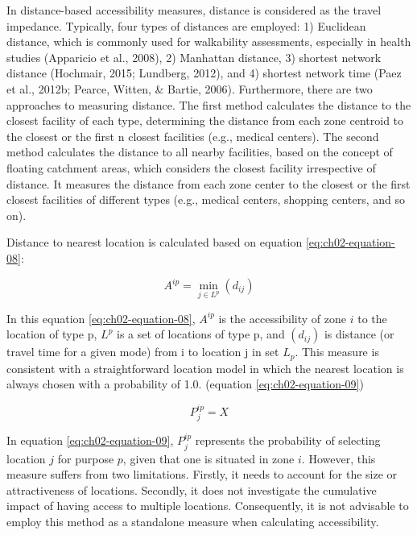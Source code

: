 \documentclass[
11pt, %
oneside, %
english, %
singlespacing, %
]{macthesis} %
\begin{document}
In distance-based accessibility measures, distance is considered as the travel impedance. Typically, four types of distances are employed: 1) Euclidean distance, which is commonly used for walkability assessments, especially in health studies (Apparicio et al., 2008), 2) Manhattan distance, 3) shortest network distance (Hochmair, 2015; Lundberg, 2012), and 4) shortest network time (Paez et al., 2012b; Pearce, Witten, \& Bartie, 2006). Furthermore, there are two approaches to measuring distance. The first method calculates the distance to the closest facility of each type, determining the distance from each zone centroid to the closest or the first n closest facilities (e.g., medical centers). The second method calculates the distance to all nearby facilities, based on the concept of floating catchment areas, which considers the closest facility irrespective of distance. It measures the distance from each zone center to the closest or the first closest facilities of different types (e.g., medical centers, shopping centers, and so on).

Distance to nearest location is calculated based on equation \ref{eq:ch02-equation-08}:

\begin{equation}
A^{ip} = \min_{j \in L^p} (d_{ij})
\label{eq:ch02-equation-08}
\end{equation}

In this equation \ref{eq:ch02-equation-08}, \(A^{ip}\) is the accessibility of zone \(i\) to the location of type p, \(L^p\) is a set of locations of type p, and \((d_{ij})\) is distance (or travel time for a given mode) from i to location j in set \(L_p\). This measure is consistent with a straightforward location model in which the nearest location is always chosen with a probability of 1.0. (equation \ref{eq:ch02-equation-09})

\begin{equation}
P^{ip}_j = X
\label{eq:ch02-equation-09}
\end{equation}

In equation \ref{eq:ch02-equation-09}, \(P_j^{ip}\) represents the probability of selecting location \(j\) for purpose \(p\), given that one is situated in zone \(i\). However, this measure suffers from two limitations. Firstly, it needs to account for the size or attractiveness of locations. Secondly, it does not investigate the cumulative impact of having access to multiple locations. Consequently, it is not advisable to employ this method as a standalone measure when calculating accessibility.
\end{document}
